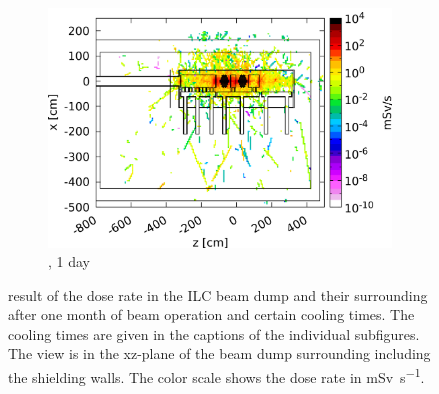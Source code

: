 \begin{figure}
\begin{subfigure}[b]{0.49\textwidth}
    \includegraphics[width=\textwidth]{Figures/BeamDump/Design2_3.png}
   \caption{\designtwo, 1 day}
   \end{subfigure}
      \hfill
   \begin{minipage}{0.49\textwidth}
   \hfill
    \end{minipage}
   \caption[Dose rate in the ILC main beam dump \designtwo after cooling times]{\fluka result of the dose rate in the ILC beam dump \designtwo and their surrounding after one month of beam operation and certain cooling times.
   The cooling times are given in the captions of the individual subfigures.
   The view is in the xz-plane of the beam dump surrounding including the shielding walls.
   The color scale shows the dose rate in \si{\milli\sievert\per\second}.}
   \label{fig:BeamDumps:DoseRate_Design2}
      \end{figure}
